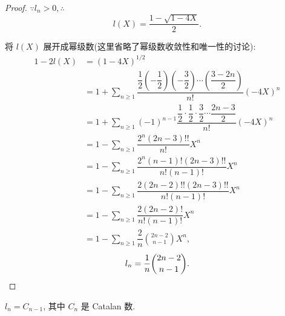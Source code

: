 \documentclass[UTF8]{ctexart}
\begin{document}
\begin{proof}
    $\because l_n>0,\therefore$
    \[l(X)=\dfrac{1-\sqrt{1-4X}}{2}.\]

    将 $l(X)$ 展开成幂级数(这里省略了幂级数收敛性和唯一性的讨论):
    \begin{align*}
        1-2l(X) & =(1-4X)^{1/2} \\
        & =1+\sum\limits_{n\geq1}\dfrac{\dfrac{1}{2}\left(-\dfrac{1}{2}\right)\left(-\dfrac{3}{2}\right)\cdots\left(\dfrac{3-2n}{2}\right)}{n!}(-4X)^n \\
        & =1+\sum\limits_{n\geq1}(-1)^{n-1}\dfrac{\dfrac{1}{2}\cdot\dfrac{1}{2}\cdot\dfrac{3}{2}\cdots\dfrac{2n-3}{2}}{n!}(-4X)^n \\
        & =1-\sum\limits_{n\geq1}\dfrac{2^n(2n-3)!!}{n!}X^n \\
        & =1-\sum\limits_{n\geq1}\dfrac{2^n(n-1)!(2n-3)!!}{n!(n-1)!}X^n \\
        & =1-\sum\limits_{n\geq1}\dfrac{2(2n-2)!!(2n-3)!!}{n!(n-1)!}X^n \\
        & =1-\sum\limits_{n\geq1}\dfrac{2(2n-2)!}{n!(n-1)!}X^n \\
        & =1-\sum\limits_{n\geq1}\dfrac{2}{n}\binom{2n-2}{n-1}X^n,
    \end{align*}
    \[l_n=\dfrac{1}{n}\binom{2n-2}{n-1}.\qedhere\]
\end{proof}
\begin{note}
    $l_n=C_{n-1}$, 其中 $C_n$ 是 Catalan 数.
\end{note}
\end{document}
